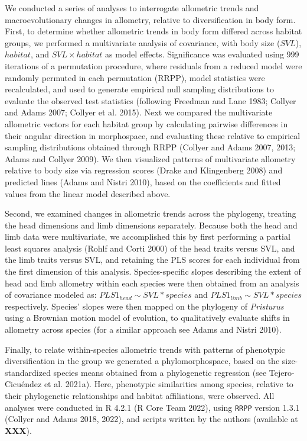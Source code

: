 \documentclass[
]{article}
\begin{document}
We conducted a series of analyses to interrogate allometric trends and
macroevolutionary changes in allometry, relative to diversification in
body form. First, to determine whether allometric trends in body form
differed across habitat groups, we performed a multivariate analysis of
covariance, with body size (\(SVL\)), \(habitat\), and
\(SVL\times habitat\) as model effects. Significance was evaluated using
999 iterations of a permutation procedure, where residuals from a
reduced model were randomly permuted in each permutation (RRPP), model
statistics were recalculated, and used to generate empirical null
sampling distributions to evaluate the observed test statistics
(following Freedman and Lane 1983; Collyer and Adams 2007; Collyer et
al. 2015). Next we compared the multivariate allometric vectors for each
habitat group by calculating pairwise differences in their angular
direction in morphospace, and evaluating these relative to empirical
sampling distributions obtained through RRPP (Collyer and Adams 2007,
2013; Adams and Collyer 2009). We then visualized patterns of
multivariate allometry relative to body size via regression scores
(Drake and Klingenberg 2008) and predicted lines (Adams and Nistri
2010), based on the coefficients and fitted values from the linear model
described above. \hfill\break

Second, we examined changes in allometric trends across the phylogeny,
treating the head dimensions and limb dimensions separately. Because
both the head and limb data were multivariate, we accomplished this by
first performing a partial least squares analysis (Rohlf and Corti 2000)
of the head traits versus SVL, and the limb traits versus SVL, and
retaining the PLS scores for each individual from the first dimension of
this analysis. Species-specific slopes describing the extent of head and
limb allometry within each species were then obtained from an analysis
of covariance modeled as: \(PLS1_{head} \sim SVL*species\) and
\(PLS1_{limb} \sim SVL*species\) respectively. Species' slopes were then
mapped on the phylogeny of \emph{Pristurus} using a Brownian motion
model of evolution, to qualitatively evaluate shifts in allometry across
species (for a similar approach see Adams and Nistri 2010). \hfill\break

Finally, to relate within-species allometric trends with patterns of
phenotypic diversification in the group we generated a phylomorphospace,
based on the size-standardized species means obtained from a
phylogenetic regression (see Tejero-Cicuéndez et al. 2021a). Here,
phenotypic similarities among species, relative to their phylogenetic
relationships and habitat affiliations, were observed. All analyses were
conducted in R 4.2.1 (R Core Team 2022), using \texttt{RRPP} version
1.3.1 (Collyer and Adams 2018, 2022), and scripts written by the authors
(available at \textbf{XXX}).
\end{document}

